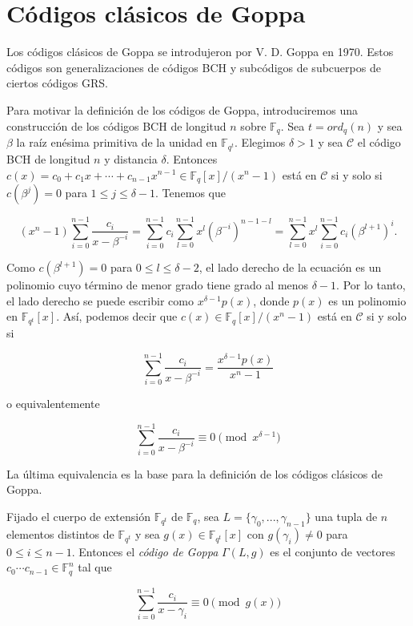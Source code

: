 \section{Códigos clásicos de Goppa}

Los códigos clásicos de Goppa se introdujeron por V. D. Goppa en 1970. Estos códigos son generalizaciones de códigos BCH y subcódigos de subcuerpos de ciertos códigos GRS.

Para motivar la definición de los códigos de Goppa, introduciremos una construcción de los códigos BCH de longitud $n$ sobre $\mathbb{F}_q$. Sea $t = ord_q(n)$ y sea $\beta$ la raíz enésima primitiva de la unidad en $\mathbb{F}_{q^t}$. Elegimos $\delta > 1$ y sea $\mathcal{C}$ el código BCH de longitud $n$ y distancia $\delta$. Entonces $c(x) = c_0 + c_1x + \cdots + c_{n-1}x^{n-1} \in \mathbb{F}_q [x] / (x^n - 1)$ está en $\mathcal{C}$ si y solo si $c(\beta^j) = 0$ para $1 \leq j \leq \delta - 1$. Tenemos que 

$$(x^n - 1) \sum_{i=0}^{n-1} \frac{c_i}{x - \beta ^{-i}} = \sum_{i=0}^{n-1} c_i \sum_{l=0}^{n-1} x^l \left( \beta ^{-i} \right) ^{n-1-l} = \sum_{l=0}^{n-1} x^l \sum_{i=0}^{n-1} c_i \left( \beta^{l+1} \right) ^i.$$

Como $c(\beta^{l+1}) = 0$ para $0 \leq l \leq \delta - 2$, el lado derecho de la ecuación es un polinomio cuyo término de menor grado tiene grado al menos $\delta - 1$. Por lo tanto, el lado derecho se puede escribir como $x^{\delta - 1} p(x)$, donde $p(x)$ es un polinomio en $\mathbb{F}_{q^t}[x]$. Así, podemos decir que $c(x) \in \mathbb{F}_q[x] / (x^n - 1)$ está en $\mathcal{C}$ si y solo si 

$$\sum_{i=0}^{n-1} \frac{c_i}{x - \beta ^{-i}} = \frac{x^{\delta - 1} p(x)}{x^n - 1}$$

o equivalentemente

$$\sum_{i=0}^{n-1} \frac{c_i}{x - \beta ^{-i}} \equiv 0 \pmod{x^{\delta - 1}}$$

La última equivalencia es la base para la definición de los códigos clásicos de Goppa.

Fijado el cuerpo de extensión $\mathbb{F}_{q^t}$ de $\mathbb{F}_q$, sea $L = \{ \gamma_0, ..., \gamma_{n-1} \}$ una tupla de $n$ elementos distintos de $\mathbb{F}_{q^t}$ y sea $g(x) \in \mathbb{F}_{q^t}[x]$ con $g(\gamma_i) \neq 0$ para $0 \leq i \leq n - 1$. Entonces el \emph{código de Goppa} $\Gamma(L,g)$ es el conjunto de vectores $c_0 \cdots c_{n-1} \in \mathbb{F}_q^n$ tal que 

\begin{equation}
    \label{def:goppa}
    \sum_{i=0}^{n-1} \frac{c_i}{x - \gamma_i} \equiv 0 \pmod{g(x)}
\end{equation}

